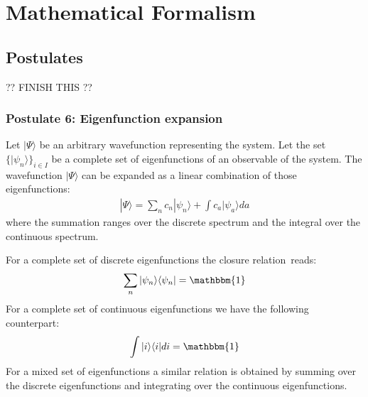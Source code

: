 \chapter{Mathematical Formalism}\label{chapter:mathematical_formalism_qm}

\section{Postulates}

?? FINISH THIS ??

\subsection{Postulate 6: Eigenfunction expansion}


	\begin{formula}
    		Let $|\Psi\rangle$ be an arbitrary wavefunction representing the system. Let the set $\{|\psi_n\rangle\}_{i\in I}$ be a complete set of eigenfunctions of an observable of the system. The wavefunction $|\Psi\rangle$ can be expanded as a linear combination of those eigenfunctions:
		\begin{gather}
	        	\label{qm_formalism:eigenfunction_expansion}
			|\Psi\rangle = \sum_nc_n|\psi_n\rangle + \int c_a|\psi_a\rangle da
		\end{gather}
	        where the summation ranges over the discrete spectrum and the integral over the continuous spectrum.
	\end{formula}

	\begin{formula}
	    	For a complete set of discrete eigenfunctions the closure relation\footnotemark\ reads:
		\begin{gather}
		        \label{qm_formalism:closure}
			\sum_n|\psi_n\rangle\langle\psi_n| = \mathbbm{1}
		\end{gather}
	        For a complete set of continuous eigenfunctions we have the following counterpart:
	        \begin{gather}
		        \label{qm_formalism:closure_continuouos}
			\int|i\rangle\langle i|di = \mathbbm{1}
		\end{gather}
	        For a mixed set of eigenfunctions a similar relation is obtained by summing over the discrete eigenfunctions and integrating over the continuous eigenfunctions.
	\end{formula}


